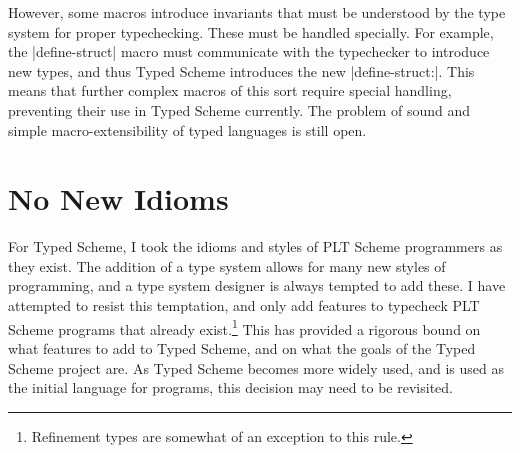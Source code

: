 \begin{schemeregion}
However, some macros introduce invariants that must be understood by
the type system for proper typechecking.  These must be handled
specially.  For example, the \scheme|define-struct| macro must
communicate with the typechecker to introduce new types, and thus
Typed Scheme introduces the new \scheme|define-struct:|.  This means
that further complex macros of this sort require special handling,
preventing their use in Typed Scheme currently.  The problem of sound
and simple macro-extensibility of typed languages is still open.  

\section{No New Idioms}

For Typed Scheme, I took the idioms and styles of PLT Scheme
programmers as they exist.  The addition of a type system allows for
many new styles of programming, and a type system designer is always
tempted to add these.  I have attempted to resist this temptation, and
only add features to typecheck PLT Scheme programs that already
exist.\footnote{Refinement types are somewhat of an exception to this
  rule.}  This has provided a rigorous bound on what features to add
to Typed Scheme, and on what the goals of the Typed Scheme project
are.  As Typed Scheme becomes more widely used, and is used as the
initial language for programs, this decision may need to be revisited.
\end{schemeregion}
